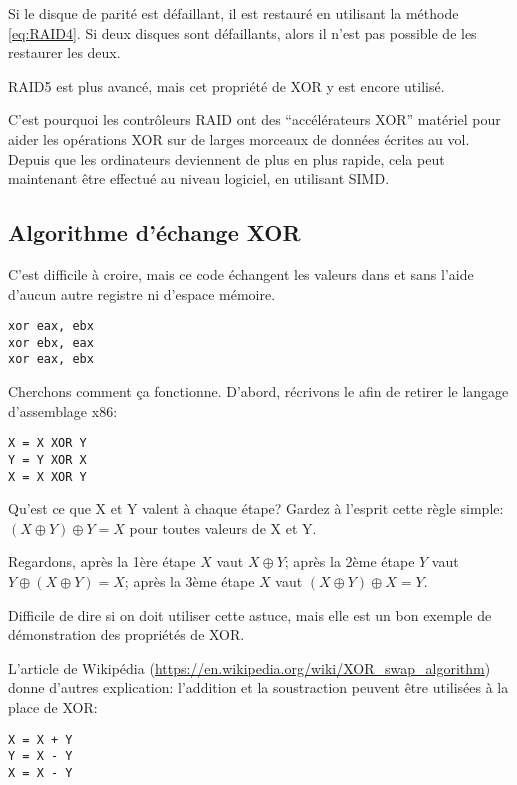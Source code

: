 Si le disque de parité est défaillant, il est restauré en utilisant la méthode \ref{eq:RAID4}.
Si deux disques sont défaillants, alors il n'est pas possible de les restaurer les
deux.

\ac{RAID}5 est plus avancé, mais cet propriété de XOR y est encore utilisé.

C'est pourquoi les contrôleurs \ac{RAID} ont des ``accélérateurs XOR'' matériel
pour aider les opérations XOR sur de larges morceaux de données écrites au vol.
Depuis que les ordinateurs deviennent de plus en plus rapide, cela peut maintenant
être effectué au niveau logiciel, en utilisant \ac{SIMD}.

\subsection{Algorithme d'échange XOR}

C'est difficile à croire, mais ce code échangent les valeurs dans \EAX et \EBX sans
l'aide d'aucun autre registre ni d'espace mémoire.

\begin{lstlisting}[style=customasmx86]
xor eax, ebx
xor ebx, eax
xor eax, ebx
\end{lstlisting}

Cherchons comment ça fonctionne.
D'abord, récrivons le afin de retirer le langage d'assemblage x86:

\begin{lstlisting}
X = X XOR Y
Y = Y XOR X
X = X XOR Y
\end{lstlisting}

Qu'est ce que X et Y valent à chaque étape?
Gardez à l'esprit cette règle simple: $(X \oplus Y) \oplus Y = X$ pour toutes valeurs
de X et Y.

Regardons,
après la 1ère étape $X$ vaut $X \oplus Y$;
après la 2ème étape $Y$ vaut $Y \oplus (X \oplus Y) = X$;
après la 3ème étape $X$ vaut $(X \oplus Y) \oplus X = Y$.

Difficile de dire si on doit utiliser cette astuce, mais elle est un bon exemple de
démonstration des propriétés de XOR.

L'article de Wikipédia (\url{https://en.wikipedia.org/wiki/XOR_swap_algorithm}) donne
d'autres explication: l'addition et la soustraction peuvent être utilisées à la place
de XOR:

\begin{lstlisting}
X = X + Y
Y = X - Y
X = X - Y
\end{lstlisting}

